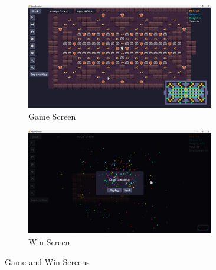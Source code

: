 \begin{figure}[!ht]
	\centering
	\begin{subfigure}{0.46\textwidth}
		\centering
		\includegraphics[width=0.9\textwidth]{imgs/screenshots/game.png}
		\caption{Game Screen}
	\end{subfigure}
	\hfill
	\begin{subfigure}{0.46\textwidth}
		\centering
		\includegraphics[width=0.9\textwidth]{imgs/screenshots/win.png}
		\caption{Win Screen}
	\end{subfigure}
	\caption{Game and Win Screens}
\end{figure}
